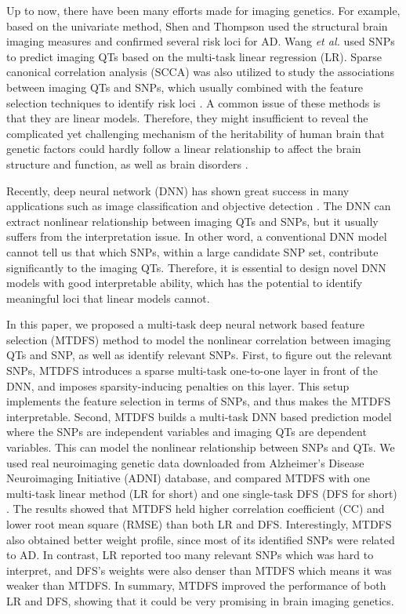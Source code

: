 \documentclass{llncs}
\begin{document}
Up to now, there have been many efforts made for imaging genetics. For example, based on the univariate method, Shen and Thompson \cite{shen2010ni} used the structural brain imaging measures and confirmed several risk loci for AD. Wang \emph{et al.} \cite{wang2012bioinfo1} used SNPs to predict imaging QTs based on the multi-task linear regression (LR). Sparse canonical correlation analysis (SCCA) was also utilized to study the associations between imaging QTs and SNPs, which usually combined with the feature selection techniques to identify risk loci \cite{du2020mia,fang2016joint,lin2013mia,yan2014eccb}. A common issue of these methods is that they are linear models. Therefore, they might insufficient to reveal the complicated yet challenging mechanism of the heritability of human brain that genetic factors could hardly follow a linear relationship to affect the brain structure and function, as well as brain disorders \cite{grasby2020,hibar2015}.

Recently, deep neural network (DNN) has shown great success in many applications such as image classification and objective detection \cite{krizhevsky2012,lecun2015}. The DNN can extract nonlinear relationship between imaging QTs and SNPs, but it usually suffers from the interpretation issue. In other word, a conventional DNN model cannot tell us that which SNPs, within a large candidate SNP set, contribute significantly to the imaging QTs. Therefore, it is essential to design novel DNN models with good interpretable ability, which has the potential to identify meaningful loci that linear models cannot.

In this paper, we proposed a multi-task deep neural network based feature selection (MTDFS) method to model the nonlinear correlation between imaging QTs and SNP, as well as identify relevant SNPs. First, to figure out the relevant SNPs, MTDFS introduces a sparse multi-task one-to-one layer in front of the DNN, and imposes sparsity-inducing penalties on this layer. This setup implements the feature selection in terms of SNPs, and thus makes the MTDFS interpretable. Second, MTDFS builds a multi-task DNN based prediction model where the SNPs are independent variables and imaging QTs are dependent variables. This can model the nonlinear relationship between SNPs and QTs. We used real neuroimaging genetic data downloaded from Alzheimer's Disease Neuroimaging Initiative (ADNI) database, and compared MTDFS with one multi-task linear method (LR for short) \cite{wang2012bioinfo1} and one single-task DFS (DFS for short) \cite{li2015}. The results showed that MTDFS held higher correlation coefficient (CC) and lower root mean square (RMSE) than both LR and DFS. Interestingly, MTDFS also obtained better weight profile, since most of its identified SNPs were related to AD. In contrast, LR reported too many relevant SNPs which was hard to interpret, and DFS's weights were also denser than MTDFS which means it was weaker than MTDFS. In summary, MTDFS improved the performance of both LR and DFS, showing that it could be very promising in brain imaging genetics.
\end{document}
